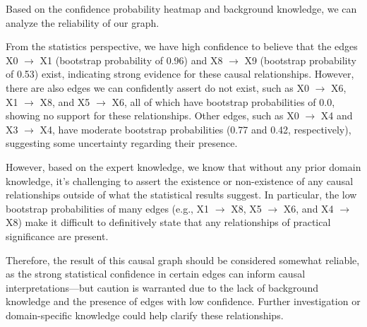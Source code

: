 \documentclass{article}
\begin{document}
Based on the confidence probability heatmap and background knowledge, we can analyze the reliability of our graph.

From the statistics perspective, we have high confidence to believe that the edges X0 $\rightarrow$ X1 (bootstrap probability of 0.96) and X8 $\rightarrow$ X9 (bootstrap probability of 0.53) exist, indicating strong evidence for these causal relationships. However, there are also edges we can confidently assert do not exist, such as X0 $\rightarrow$ X6, X1 $\rightarrow$ X8, and X5 $\rightarrow$ X6, all of which have bootstrap probabilities of 0.0, showing no support for these relationships. Other edges, such as X0 $\rightarrow$ X4 and X3 $\rightarrow$ X4, have moderate bootstrap probabilities (0.77 and 0.42, respectively), suggesting some uncertainty regarding their presence.

However, based on the expert knowledge, we know that without any prior domain knowledge, it's challenging to assert the existence or non-existence of any causal relationships outside of what the statistical results suggest. In particular, the low bootstrap probabilities of many edges (e.g., X1 $\rightarrow$ X8, X5 $\rightarrow$ X6, and X4 $\rightarrow$ X8) make it difficult to definitively state that any relationships of practical significance are present. 

Therefore, the result of this causal graph should be considered somewhat reliable, as the strong statistical confidence in certain edges can inform causal interpretations—but caution is warranted due to the lack of background knowledge and the presence of edges with low confidence. Further investigation or domain-specific knowledge could help clarify these relationships.
\end{document}
